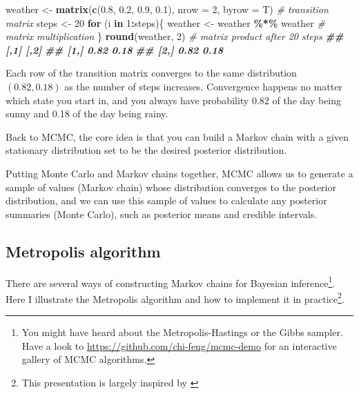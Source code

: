 \documentclass[
  12pt,
]{krantz}
\makeatletter
\newenvironment{Shaded}{\begin{snugshade}}{\end{snugshade}}
\newcommand{\AttributeTok}[1]{\textcolor[rgb]{0.13,0.29,0.53}{#1}}
\newcommand{\CommentTok}[1]{\textcolor[rgb]{0.56,0.35,0.01}{\textit{#1}}}
\newcommand{\ControlFlowTok}[1]{\textcolor[rgb]{0.13,0.29,0.53}{\textbf{#1}}}
\newcommand{\DecValTok}[1]{\textcolor[rgb]{0.00,0.00,0.81}{#1}}
\newcommand{\DocumentationTok}[1]{\textcolor[rgb]{0.56,0.35,0.01}{\textbf{\textit{#1}}}}
\newcommand{\FloatTok}[1]{\textcolor[rgb]{0.00,0.00,0.81}{#1}}
\newcommand{\FunctionTok}[1]{\textcolor[rgb]{0.13,0.29,0.53}{\textbf{#1}}}
\newcommand{\NormalTok}[1]{#1}
\newcommand{\OtherTok}[1]{\textcolor[rgb]{0.56,0.35,0.01}{#1}}
\newcommand{\SpecialCharTok}[1]{\textcolor[rgb]{0.81,0.36,0.00}{\textbf{#1}}}
\newenvironment{kframe}{%
\medskip{}
\setlength{\fboxsep}{.8em}
 \def\at@end@of@kframe{}%
 \ifinner\ifhmode%
  \def\at@end@of@kframe{\end{minipage}}%
  \begin{minipage}{\columnwidth}%
 \fi\fi%
 \def\FrameCommand##1{\hskip\@totalleftmargin \hskip-\fboxsep
 \colorbox{shadecolor}{##1}\hskip-\fboxsep
     \hskip-\linewidth \hskip-\@totalleftmargin \hskip\columnwidth}%
 \MakeFramed {\advance\hsize-\width
   \@totalleftmargin\z@ \linewidth\hsize
   \@setminipage}}%
 {\par\unskip\endMakeFramed%
 \at@end@of@kframe}
\newenvironment{rmdblock}[1]
  {
  \begin{itemize}
  \renewcommand{\labelitemi}{
    \raisebox{-.7\height}[0pt][0pt]{
      {\setkeys{Gin}{width=3em,keepaspectratio}\texttt{[image: images/\#1]}}
    }
  }
  \setlength{\fboxsep}{1em}
  \begin{kframe}
  \item
  }
  {
  \end{kframe}
  \end{itemize}
  }
\newenvironment{rmdnote}
  {\begin{rmdblock}{note}}
  {\end{rmdblock}}
\makeatother
\begin{document}
\begin{Shaded}
\begin{Highlighting}[]
\NormalTok{weather }\OtherTok{\textless{}{-}} \FunctionTok{matrix}\NormalTok{(}\FunctionTok{c}\NormalTok{(}\FloatTok{0.8}\NormalTok{, }\FloatTok{0.2}\NormalTok{, }\FloatTok{0.9}\NormalTok{, }\FloatTok{0.1}\NormalTok{), }\AttributeTok{nrow =} \DecValTok{2}\NormalTok{, }\AttributeTok{byrow =}\NormalTok{ T) }\CommentTok{\# transition matrix}
\NormalTok{steps }\OtherTok{\textless{}{-}} \DecValTok{20}
\ControlFlowTok{for}\NormalTok{ (i }\ControlFlowTok{in} \DecValTok{1}\SpecialCharTok{:}\NormalTok{steps)\{}
\NormalTok{  weather }\OtherTok{\textless{}{-}}\NormalTok{ weather }\SpecialCharTok{\%*\%}\NormalTok{ weather }\CommentTok{\# matrix multiplication}
\NormalTok{\}}
\FunctionTok{round}\NormalTok{(weather, }\DecValTok{2}\NormalTok{) }\CommentTok{\# matrix product after 20 steps}
\DocumentationTok{\#\#      [,1] [,2]}
\DocumentationTok{\#\# [1,] 0.82 0.18}
\DocumentationTok{\#\# [2,] 0.82 0.18}
\end{Highlighting}
\end{Shaded}

Each row of the transition matrix converges to the same distribution \((0.82, 0.18)\) as the number of steps increases. Convergence happens no matter which state you start in, and you always have probability 0.82 of the day being sunny and 0.18 of the day being rainy.

Back to MCMC, the core idea is that you can build a Markov chain with a given stationary distribution set to be the desired posterior distribution.

\begin{rmdnote}
Putting Monte Carlo and Markov chains together, MCMC allows us to generate a sample of values (Markov chain) whose distribution converges to the posterior distribution, and we can use this sample of values to calculate any posterior summaries (Monte Carlo), such as posterior means and credible intervals.
\end{rmdnote}

\hypertarget{metropolis-algorithm}{%
\subsection{Metropolis algorithm}\label{metropolis-algorithm}}

There are several ways of constructing Markov chains for Bayesian inference\footnote{You might have heard about the Metropolis-Hastings or the Gibbs sampler. Have a look to \url{https://github.com/chi-feng/mcmc-demo} for an interactive gallery of MCMC algorithms.}. Here I illustrate the Metropolis algorithm and how to implement it in practice\footnote{This presentation is largely inspired by \citet{alberthu2019}}.
\end{document}

